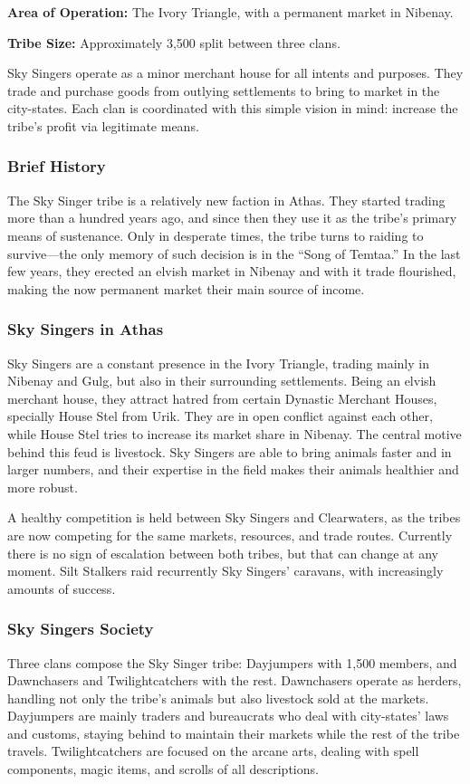 \textbf{Area of Operation:} The Ivory Triangle, with a permanent market in Nibenay.

\textbf{Tribe Size:} Approximately 3,500 split between three clans.

Sky Singers operate as a minor merchant house for all intents and purposes. They trade and purchase goods from outlying settlements to bring to market in the city-states. Each clan is coordinated with this simple vision in mind: increase the tribe's profit via legitimate means.

\subsubsection{Brief History}
The Sky Singer tribe is a relatively new faction in Athas. They started trading more than a hundred years ago, and since then they use it as the tribe's primary means of sustenance. Only in desperate times, the tribe turns to raiding to survive---the only memory of such decision is in the ``Song of Temtaa.'' In the last few years, they erected an elvish market in Nibenay and with it trade flourished, making the now permanent market their main source of income.

\subsubsection{Sky Singers in Athas}
Sky Singers are a constant presence in the Ivory Triangle, trading mainly in Nibenay and Gulg, but also in their surrounding settlements. Being an elvish merchant house, they attract hatred from certain Dynastic Merchant Houses, specially House Stel from Urik. They are in open conflict against each other, while House Stel tries to increase its market share in Nibenay. The central motive behind this feud is livestock. Sky Singers are able to bring animals faster and in larger numbers, and their expertise in the field makes their animals healthier and more robust.

A healthy competition is held between Sky Singers and Clearwaters, as the tribes are now competing for the same markets, resources, and trade routes. Currently there is no sign of escalation between both tribes, but that can change at any moment. Silt Stalkers raid recurrently Sky Singers' caravans, with increasingly amounts of success.

\subsubsection{Sky Singers Society}
Three clans compose the Sky Singer tribe: Dayjumpers with 1,500 members, and Dawnchasers and Twilightcatchers with the rest. Dawnchasers operate as herders, handling not only the tribe's animals but also livestock sold at the markets. Dayjumpers are mainly traders and bureaucrats who deal with city-states' laws and customs, staying behind to maintain their markets while the rest of the tribe travels. Twilightcatchers are focused on the arcane arts, dealing with spell components, magic items, and scrolls of all descriptions.

